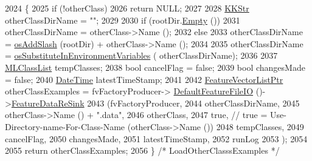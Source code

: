 \begin{DoxyCode}
2024 \{
2025   \textcolor{keywordflow}{if}  (!otherClass)
2026     \textcolor{keywordflow}{return} NULL;
2027 
2028   \hyperlink{class_k_k_b_1_1_k_k_str}{KKStr} otherClassDirName = \textcolor{stringliteral}{""};
2029 
2030   \textcolor{keywordflow}{if}  (rootDir.\hyperlink{class_k_k_b_1_1_k_k_str_ac69942f73fffd672ec2a6e1c410afdb6}{Empty} ())
2031     otherClassDirName = otherClass->Name ();
2032   \textcolor{keywordflow}{else}
2033     otherClassDirName = \hyperlink{namespace_k_k_b_aa0d40119b911df4283399a1724cab1ef}{osAddSlash} (rootDir) + otherClass->Name ();
2034 
2035   otherClassDirName = \hyperlink{namespace_k_k_b_a8f06168f97c35a03150eec763fb2c53e}{osSubstituteInEnvironmentVariables} (
      otherClassDirName);
2036 
2037   \hyperlink{class_k_k_m_l_l_1_1_m_l_class_list}{MLClassList}  tempClasses;
2038   \textcolor{keywordtype}{bool}  cancelFlag  = \textcolor{keyword}{false};
2039   \textcolor{keywordtype}{bool}  changesMade = \textcolor{keyword}{false};
2040   \hyperlink{class_k_k_b_1_1_date_time}{DateTime}  latestTimeStamp;
2041 
2042   \hyperlink{class_k_k_m_l_l_1_1_feature_vector_list}{FeatureVectorListPtr}  otherClassExamples = fvFactoryProducer->
      \hyperlink{class_k_k_m_l_l_1_1_factory_f_v_producer_a22605809beffdb9e6b1df75106140458}{DefaultFeatureFileIO} ()->\hyperlink{class_k_k_m_l_l_1_1_feature_file_i_o_a287df1dbb04495d7a4dc23b3af1a2ca6}{FeatureDataReSink} 
2043                                 (fvFactoryProducer, 
2044                                  otherClassDirName,
2045                                  otherClass->Name () + \textcolor{stringliteral}{".data"},
2046                                  otherClass,
2047                                  \textcolor{keyword}{true},   \textcolor{comment}{//  true = Use-Directory-name-For-Class-Name (otherClass->Name ())}
2048                                  tempClasses,
2049                                  cancelFlag,
2050                                  changesMade,
2051                                  latestTimeStamp,
2052                                  runLog
2053                                 );
2054 
2055   \textcolor{keywordflow}{return}  otherClassExamples;
2056 \}  \textcolor{comment}{/* LoadOtherClasssExamples */}
\end{DoxyCode}
